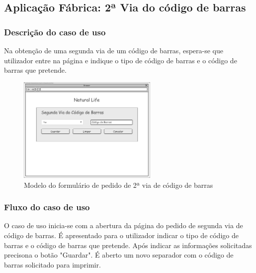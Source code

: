 \subsection{Aplicação Fábrica: 2ª Via do código de barras}
\subsubsection*{Descrição do caso de uso}
Na obtenção de uma segunda via de um código de barras, espera-se que utilizador entre na página e indique o tipo de código de barras e o código de barras que pretende. 

\begin{figure}[H] 
	\begin{center}
		\includegraphics[width=0.60\textwidth,keepaspectratio]{figuras/Diagramas_vp/DI_Fabrica_6_2_Via_Codigo_de_Barras.jpg}
		\caption{Modelo do formulário de pedido de 2ª via de código de barras}
		\label{fig:di_2_via} 
	\end{center}
\end{figure}

\subsubsection*{Fluxo do caso de uso}
O caso de uso inicia-se com a abertura da página do pedido de segunda via de código de barras. É apresentado para o utilizador indicar o tipo de código de barras e o código de barras que pretende. Após indicar as informações solicitadas precisona o botão "Guardar". É aberto um novo separador com o código de barras solicitado para imprimir.


